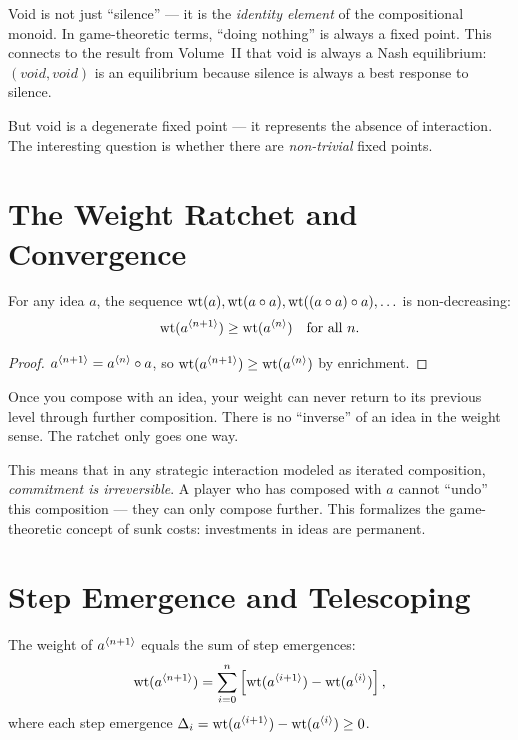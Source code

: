 \begin{interpretation}
Void is not just ``silence'' --- it is the \emph{identity element} of the compositional monoid. In game-theoretic terms, ``doing nothing'' is always a fixed point. This connects to the result from Volume~II that void is always a Nash equilibrium: $(void, void)$ is an equilibrium because silence is always a best response to silence.

But void is a degenerate fixed point --- it represents the absence of interaction. The interesting question is whether there are \emph{non-trivial} fixed points.
\end{interpretation}

\section{The Weight Ratchet and Convergence}

\begin{theorem}
\label{thm:weight-ratchet}
For any idea $a$, the sequence $\operatorname{wt}(a), \operatorname{wt}(a \circ a), \operatorname{wt}((a \circ a) \circ a), \ldots$ is non-decreasing:
\[
\operatorname{wt}(a^{\langle n+1 \rangle}) \geq \operatorname{wt}(a^{\langle n \rangle}) \quad \text{for all } n.
\]
\end{theorem}

\begin{proof}
$a^{\langle n+1 \rangle} = a^{\langle n \rangle} \circ a$, so $\operatorname{wt}(a^{\langle n+1 \rangle}) \geq \operatorname{wt}(a^{\langle n \rangle})$ by enrichment.
\end{proof}

\begin{paradox}
Once you compose with an idea, your weight can never return to its previous level through further composition. There is no ``inverse'' of an idea in the weight sense. The ratchet only goes one way.

This means that in any strategic interaction modeled as iterated composition, \emph{commitment is irreversible}. A player who has composed with $a$ cannot ``undo'' this composition --- they can only compose further. This formalizes the game-theoretic concept of sunk costs: investments in ideas are permanent.
\end{paradox}

\section{Step Emergence and Telescoping}

\begin{theorem}
\label{thm:telescoping}
The weight of $a^{\langle n+1 \rangle}$ equals the sum of step emergences:
\[
\operatorname{wt}(a^{\langle n+1 \rangle}) = \sum_{i=0}^{n} \left[\operatorname{wt}(a^{\langle i+1 \rangle}) - \operatorname{wt}(a^{\langle i \rangle})\right],
\]
where each step emergence $\Delta_i = \operatorname{wt}(a^{\langle i+1 \rangle}) - \operatorname{wt}(a^{\langle i \rangle}) \geq 0$.
\end{theorem}

